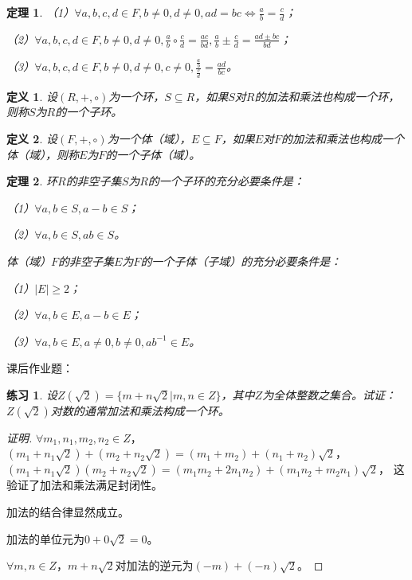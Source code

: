 \documentclass{article}
\newtheorem{Def}{定义}
\newtheorem{Thm}{定理}
\newtheorem{Exercise}{练习}
\begin{document}
\begin{CJK*}{UTF8}{gbsn}
\begin{Thm}
    （1）$\forall a,b,c,d\in F, b\neq 0, d\neq 0, ad=bc \Leftrightarrow \frac{a}{b} = \frac{c}{d}$；
  
    （2）$\forall a,b,c,d\in F, b\neq 0, d\neq 0, \frac{a}{b}\circ \frac{c}{d}=\frac{ac}{bd}, \frac{a}{b}\pm\frac{c}{d}=\frac{ad\pm bc}{bd}$；
  
    （3）$\forall a,b,c,d\in F, b\neq 0, d\neq 0,c\neq 0, \frac{\frac{a}{b}}{\frac{c}{d}}=\frac{ad}{bc}$。
  \end{Thm}
  
  \begin{Def}
    设$(R,+,\circ)$为一个环，$S\subseteq R$，如果$S$对$R$的加法和乘法也构成一个环，则称$S$为$R$的一个子环。
  \end{Def}
  
  \begin{Def}
    设$(F,+,\circ)$为一个体（域），$E\subseteq F$，如果$E$对$F$的加法和乘法也构成一个体（域），则称$E$为$F$的一个子体（域）。
  \end{Def}
  \begin{Thm}
    环$R$的非空子集$S$为$R$的一个子环的充分必要条件是：
  
    （1）$\forall a,b\in S, a-b\in S$；
  
    （2）$\forall a,b\in S, ab\in S$。
  
    体（域）$F$的非空子集$E$为$F$的一个子体（子域）的充分必要条件是：
  
    （1）$|E|\geq 2$；
  
    （2）$\forall a,b \in E, a-b\in E$；
  
    （3）$\forall a,b \in E, a\neq 0, b\neq 0, ab^{-1}\in E$。
  \end{Thm}  



课后作业题：
\begin{Exercise}
  设$Z(\sqrt{2})=\{m+n\sqrt{2}|m,n\in Z\}$，其中$Z$为全体整数之集合。试证：$Z(\sqrt{2})$对数的通常加法和乘法构成一个环。
\end{Exercise}
\begin{proof}[证明]
  $\forall m_1,n_1,m_2,n_2\in Z$，$(m_1+n_1\sqrt{2})+(m_2+n_2\sqrt{2})=(m_1+m_2)+(n_1+n_2)\sqrt{2}$，$(m_1+n_1\sqrt{2})(m_2+n_2\sqrt{2})=(m_1m_2+2n_1n_2)+(m_1n_2+m_2n_1)\sqrt{2}$，
  这验证了加法和乘法满足封闭性。

  加法的结合律显然成立。

  加法的单位元为$0+0\sqrt{2}=0$。

  $\forall m,n\in Z$，$m+n\sqrt{2}$对加法的逆元为$(-m)+(-n)\sqrt{2}$。


\end{proof}
\end{CJK*}
\end{document}
